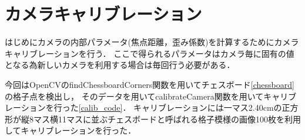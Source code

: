 \section{カメラキャリブレーション}
\label{calib}

はじめにカメラの内部パラメータ(焦点距離，歪み係数)を計算するためにカメラキャリブレーションを行う\cite{calib}．
ここで得られるパラメータはカメラ毎に固有の値となる為新しいカメラを利用する場合は毎回行う必要がある．

今回はOpenCVのfindChessboardCorners関数\cite{cvcalib}を用いてチェスボード\ref{chessboard}の格子点を検出し，
そのデータを用いてcalibrateCamera関数を用いてキャリブレーションを行った\ref{calib_code}．
キャリブレーションには一マス2.40cmの正方形が縦8マス横11マスに並ぶチェスボードと呼ばれる格子模様の画像100枚を利用してキャリブレーションを行った．

